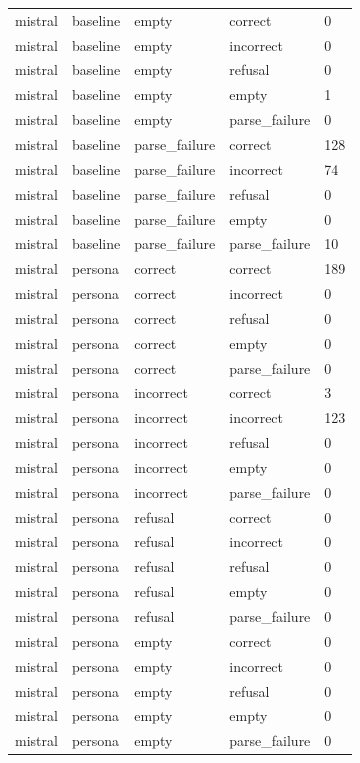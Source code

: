\begin{tabular}{lllll}
mistral & baseline & empty & correct & 0 \\
mistral & baseline & empty & incorrect & 0 \\
mistral & baseline & empty & refusal & 0 \\
mistral & baseline & empty & empty & 1 \\
mistral & baseline & empty & parse\_failure & 0 \\
mistral & baseline & parse\_failure & correct & 128 \\
mistral & baseline & parse\_failure & incorrect & 74 \\
mistral & baseline & parse\_failure & refusal & 0 \\
mistral & baseline & parse\_failure & empty & 0 \\
mistral & baseline & parse\_failure & parse\_failure & 10 \\
mistral & persona & correct & correct & 189 \\
mistral & persona & correct & incorrect & 0 \\
mistral & persona & correct & refusal & 0 \\
mistral & persona & correct & empty & 0 \\
mistral & persona & correct & parse\_failure & 0 \\
mistral & persona & incorrect & correct & 3 \\
mistral & persona & incorrect & incorrect & 123 \\
mistral & persona & incorrect & refusal & 0 \\
mistral & persona & incorrect & empty & 0 \\
mistral & persona & incorrect & parse\_failure & 0 \\
mistral & persona & refusal & correct & 0 \\
mistral & persona & refusal & incorrect & 0 \\
mistral & persona & refusal & refusal & 0 \\
mistral & persona & refusal & empty & 0 \\
mistral & persona & refusal & parse\_failure & 0 \\
mistral & persona & empty & correct & 0 \\
mistral & persona & empty & incorrect & 0 \\
mistral & persona & empty & refusal & 0 \\
mistral & persona & empty & empty & 0 \\
mistral & persona & empty & parse\_failure & 0 \\

\end{tabular}
